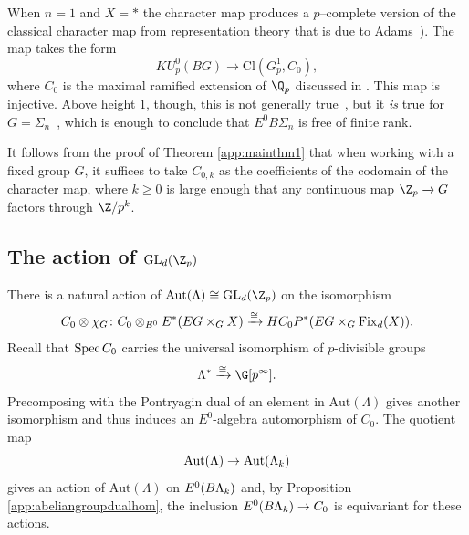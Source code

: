 


\begin{example}\label{KUCharacterExample}
When \(n=1\) and \(X = *\) the character map produces a \(p\)--complete version of the classical character map from representation theory that is due to Adams~\cite[Section 2]{AdamsClassifyingSpacesII}).
The map takes the form
\[
KU_{p}^{0}(BG) \xrightarrow{} \mathrm{Cl}(G_{p}^{1}, C_0),
\]
where \(C_0\) is the maximal ramified extension of \(\Q_p\) discussed in .
This map is injective.
Above height \(1\), though, this is not generally true~\cite{Kriz}, but it \emph{is} true for $G = \Sigma_n$~\cite[Theorem 7.3]{HKR}, which is enough to conclude that $E^0 B\Sigma_n$ is free of finite rank.
\end{example}

\begin{remark}
It follows from the proof of Theorem \ref{app:mainthm1} that when working with a fixed group \(G\), it suffices to take \(C_{0,k}\) as the coefficients of the codomain of the character map, where \(k \geq 0\) is large enough that any continuous map \(\Z_p \xrightarrow{} G\) factors through \(\Z/p^k\).
\end{remark}

\subsection{The action of \(\mathrm{GL}_d(\Z_p)\)}

There is a natural action of \(\mathrm{Aut}(\Lambda) \cong \mathrm{GL}_d(\Z_p)\) on the isomorphism
\[
C_0 \otimes \chi_G \colon C_0 \otimes_{E^0} E^*(EG \times_G X) \xrightarrow{\cong} HC_{0}P^{*}(EG \times_G \operatorname{Fix}_d(X)).
\]
Recall that \(\operatorname{Spec} C_0\) carries the universal isomorphism of \(p\)-divisible groups
\[
\Lambda^* \xrightarrow{\cong} \G[p^\infty].
\]
Precomposing with the Pontryagin dual of an element in \(\mathrm{Aut}(\Lambda)\) gives another isomorphism and thus induces an \(E^0\)-algebra automorphism of \(C_0\).
The quotient map
\[
\mathrm{Aut}(\Lambda) \to \mathrm{Aut}(\Lambda_k)
\]  
gives an action of \(\mathrm{Aut}(\Lambda)\) on \(E^0(B\Lambda_k)\) and, by Proposition \ref{app:abeliangroupdualhom}, the inclusion \(E^0(B\Lambda_k) \to C_0\) is equivariant for these actions.

